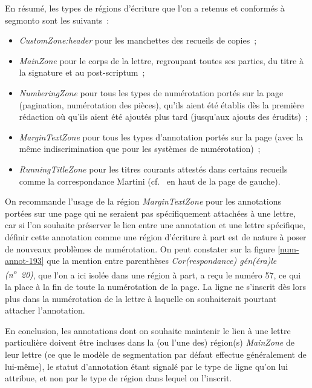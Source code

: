 \documentclass[a4paper,12pt,twoside]{book}
\begin{document}
				En résumé, les types de régions d'écriture que l'on a retenus et conformés à \gls{segmonto} sont les suivants~:
				
				\begin{itemize}
					\item \textit{CustomZone:header} pour les manchettes des recueils de copies~;
					\item \textit{MainZone} pour le corps de la lettre, regroupant toutes ses parties, du titre à la signature et au post-scriptum~;
					\item \textit{NumberingZone} pour tous les types de numérotation portés sur la page (pagination, numérotation des pièces), qu'ils aient été établis dès la première rédaction où qu'ils aient été ajoutés plus tard (jusqu'aux ajouts des érudits)~;
					\item \textit{MarginTextZone} pour tous les types d'annotation portés sur la page (avec la même indiscrimination que pour les systèmes de numérotation)~;
					\item \textit{RunningTitleZone} pour les titres courants attestés dans certains recueils comme la correspondance Martini (cf.~\cite{CdS19054056} en haut de la page de gauche).
				\end{itemize}
				
				On recommande l'usage de la région \textit{MarginTextZone} pour les annotations portées sur une page qui ne seraient pas spécifiquement attachées à une lettre, car si l'on souhaite préserver le lien entre une annotation et une lettre spécifique, définir cette annotation comme une région d'écriture à part est de nature à poser de nouveaux problèmes de numérotation. On peut constater sur la figure \ref{num-annot-193} que la mention entre parenthèses \textit{Cor(respondance) gén(éra)le (n\textsuperscript{o}~20)}, que l'on a ici isolée dans une région à part, a reçu le numéro 57, ce qui la place à la fin de toute la numérotation de la page. La ligne ne s'inscrit dès lors plus dans la numérotation de la lettre à laquelle on souhaiterait pourtant attacher l'annotation.
				
				En conclusion, les annotations dont on souhaite maintenir le lien à une lettre particulière doivent être incluses dans la (ou l'une des) région(s) \textit{MainZone} de leur lettre (ce que le modèle de \gls{segmentation} par défaut effectue généralement de lui-même), le statut d'annotation étant signalé par le type de ligne qu'on lui attribue, et non par le type de région dans lequel on l'inscrit.
				
\end{document}
